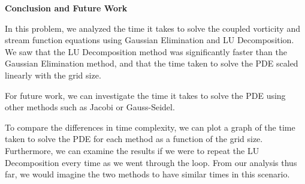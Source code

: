 \documentclass[a4paper,12pt, fleqn]{article}
\begin{document}
\begin{enumerate}
        \textbf{Conclusion and Future Work}

        In this problem, we analyzed the time it takes to solve the coupled vorticity and stream
        function equations using Gaussian Elimination and LU Decomposition. We saw that the LU
        Decomposition method was significantly faster than the Gaussian Elimination method, and
        that the time taken to solve the PDE scaled linearly with the grid size.

        For future work, we can investigate the time it takes to solve the PDE using other methods
        such as Jacobi or Gauss-Seidel.
        
        To compare the differences in time complexity, we can plot a graph of the time taken to
        solve the PDE for each method as a function of the grid size. Furthermore, we can examine the
        results if we were to repeat the LU Decomposition every time as we went through the loop. 
        From our analysis thus far, we would imagine the two methods to have similar times in 
        this scenario. 
\end{enumerate}
    
\end{document}
